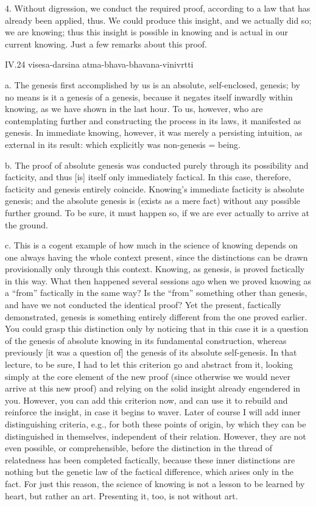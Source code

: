 4. Without digression, we conduct the required proof,
according to a law that has already been applied, thus.
We could produce this insight,
and we actually did so; we are knowing;
thus this insight is possible in knowing
and is actual in our current knowing.
Just a few remarks about this proof.

IV.24
visesa-darsina atma-bhava-bhavana-vinivrtti

a. The genesis first accomplished by us is
an absolute, self-enclosed, genesis;
by no means is it a genesis of a genesis,
because it negates itself inwardly within knowing,
as we have shown in the last hour.
To us, however, who are contemplating further
and constructing the process in its laws,
it manifested as genesis.
In immediate knowing, however,
it was merely a persisting intuition,
as external in its result:
which explicitly was non-genesis = being.

b. The proof of absolute genesis was conducted purely
through its possibility and facticity,
and thus [is] itself only immediately factical.
In this case, therefore, facticity and genesis entirely coincide.
Knowing's immediate facticity is absolute genesis;
and the absolute genesis is (exists as a mere fact)
without any possible further ground.
To be sure, it must happen so,
if we are ever actually to arrive at the ground.

c. This is a cogent example of how much
in the science of knowing depends on one
always having the whole context present,
since the distinctions can be drawn
provisionally only through this context.
Knowing, as genesis, is proved factically in this way.
What then happened several sessions ago when
we proved knowing as a “from” factically in the same way?
Is the “from” something other than genesis,
and have we not conducted the identical proof?
Yet the present, factically demonstrated, genesis is
something entirely different from the one proved earlier.
You could grasp this distinction only by
noticing that in this case it is a question of
the genesis of absolute knowing in its fundamental construction,
whereas previously [it was a question of] the
genesis of its absolute self-genesis.
In that lecture, to be sure, I had to let this
criterion go and abstract from it,
looking simply at the core element of the new proof
(since otherwise we would never arrive at this new proof)
and relying on the solid insight already engendered in you.
However, you can add this criterion now,
and can use it to rebuild and reinforce the insight,
in case it begins to waver.
Later of course I will add inner distinguishing criteria,
e.g., for both these points of origin,
by which they can be distinguished in themselves,
independent of their relation.
However, they are not even possible, or comprehensible,
before the distinction in the thread of relatedness
has been completed factically,
because these inner distinctions are nothing but
the genetic law of the factical difference,
which arises only in the fact.
For just this reason, the science of knowing is
not a lesson to be learned by heart,
but rather an art.
Presenting it, too, is not without art.


